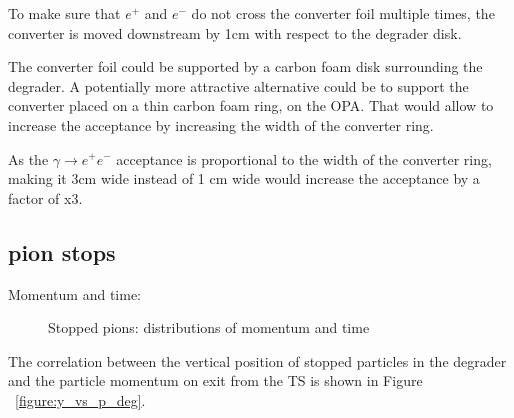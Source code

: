 To make sure that $e^+$ and $e^-$ do not cross the converter foil multiple times,
the converter is moved downstream by 1cm with respect to the degrader disk.

The converter foil could be supported by a carbon foam disk surrounding the degrader.
A potentially more attractive alternative could be to support the converter placed
on a thin carbon foam ring, on the OPA. That would allow to increase the acceptance
by increasing the width of the converter ring.

As the $\gamma \to e^+e^-$ acceptance is proportional to the width of the converter ring,
making it 3cm wide instead of 1 cm wide would increase the acceptance by a factor of x3.

\subsection{pion stops}

Momentum and time:

\begin{figure}[H]
  \caption{
    \label{figure:sum_mom_vd13}
    Stopped pions: distributions of momentum and time
  }
\end{figure}


The correlation between the vertical position of stopped particles in the degrader and the particle momentum
on exit from the TS is shown in Figure ~\ref{figure:y_vs_p_deg}.

